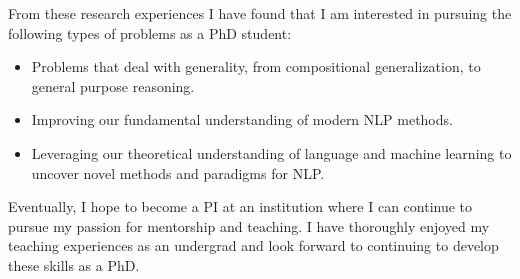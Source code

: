 \documentclass[12pt]{article}
\begin{document}
From these research experiences I have found that 
I am interested in pursuing the following types of problems as a PhD student:
\begin{itemize}
  \item Problems that deal with generality,
    from compositional generalization, to general purpose reasoning.
  \item Improving our fundamental understanding of modern NLP methods. 
  \item Leveraging our theoretical understanding of language and machine learning
    to uncover novel methods and paradigms for NLP. 
\end{itemize}

Eventually, I hope to become a PI 
at an institution where I can continue to pursue my passion 
for mentorship and teaching.
I have thoroughly enjoyed my teaching experiences as an undergrad 
and look forward to continuing to develop these skills as a PhD.




\end{document}
